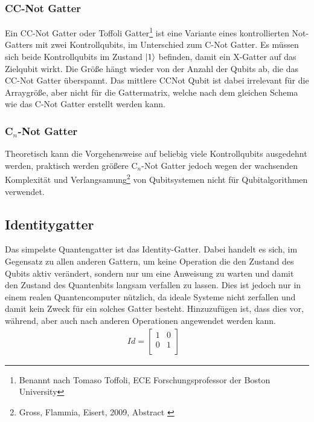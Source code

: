 \documentclass[12pt]{report}
\begin{document}
\newpage

\subsubsection{CC-Not Gatter}			%
Ein CC-Not Gatter oder Toffoli Gatter\footnote{Benannt nach Tomaso Toffoli, \glqq ECE\grqq{} Forschungsprofessor der \glqq Boston University\grqq} ist eine Variante eines kontrollierten Not-Gatters mit zwei Kontrollqubits, im Unterschied zum C-Not Gatter. Es müssen sich beide Kontrollqubits im Zustand $\ket{1}$ befinden, damit ein X-Gatter auf das Zielqubit wirkt. Die Größe hängt wieder von der Anzahl der Qubits ab, die das CC-Not Gatter überspannt. Das mittlere CCNot Qubit ist dabei irrelevant für die Arraygröße, aber nicht für die Gattermatrix, welche nach dem gleichen Schema wie das C-Not Gatter erstellt werden kann.

\subsubsection{C$_{n}$-Not Gatter}
Theoretisch kann die Vorgehensweise auf beliebig viele Kontrollqubits ausgedehnt werden, praktisch werden größere C$_n$-Not Gatter jedoch wegen der wachsenden Komplexität und Verlangsamung\footnote{Gross, Flammia, Eisert, 2009, Abstract \cite{p234-5}} von Qubitsystemen nicht für Qubitalgorithmen verwendet.
	\subsection{Identitygatter} 
Das simpelste Quantengatter ist das Identity-Gatter. Dabei handelt es sich, im Gegensatz zu allen anderen Gattern, um keine Operation die den Zustand des Qubits aktiv verändert, sondern nur um eine Anweisung zu warten und damit den Zustand des Quantenbits langsam verfallen zu lassen. Dies ist jedoch nur in einem realen Quantencomputer nützlich, da ideale Systeme nicht zerfallen und damit kein Zweck für ein solches Gatter besteht. Hinzuzufügen ist, dass dies vor, während, aber auch nach anderen Operationen angewendet werden kann. 
\begin{align*}
Id= \begin{bmatrix} 
1&0\\
0&1\\
\end{bmatrix} &
\end{align*}
\end{document}
